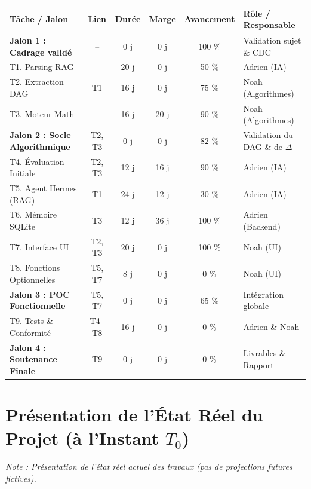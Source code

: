 \documentclass[11pt, a4paper]{article}
\begin{document}
\begin{table}[H]
\centering
\small
\begin{tabularx}{\textwidth}{l c c c c l}
\toprule
\textbf{Tâche / Jalon} & \textbf{Lien} & \textbf{Durée} & \textbf{Marge} & \textbf{Avancement} & \textbf{Rôle / Responsable} \\
\midrule
\textbf{Jalon 1 : Cadrage validé} & -- & 0 j & 0 j & 100 \% & Validation sujet \& CDC \\
T1. Parsing RAG & -- & 20 j & 0 j & 50 \% & Adrien (IA) \\
T2. Extraction DAG & T1 & 16 j & 0 j & 75 \% & Noah (Algorithmes) \\
T3. Moteur Math & -- & 16 j & 20 j & 90 \% & Noah (Algorithmes) \\
\textbf{Jalon 2 : Socle Algorithmique} & T2, T3 & 0 j & 0 j & 82 \% & Validation du DAG \& de $\Delta$ \\
T4. Évaluation Initiale & T2, T3 & 12 j & 16 j & 90 \% & Adrien (IA) \\
T5. Agent Hermes (RAG) & T1 & 24 j & 12 j & 30 \% & Adrien (IA) \\
T6. Mémoire SQLite & T3 & 12 j & 36 j & 100 \% & Adrien (Backend) \\
T7. Interface UI & T2, T3 & 20 j & 0 j & 100 \% & Noah (UI) \\
T8. Fonctions Optionnelles & T5, T7 & 8 j & 0 j & 0 \% & Noah (UI) \\
\textbf{Jalon 3 : POC Fonctionnelle} & T5, T7 & 0 j & 0 j & 65 \% & Intégration globale \\
T9. Tests \& Conformité & T4--T8 & 16 j & 0 j & 0 \% & Adrien \& Noah \\
\textbf{Jalon 4 : Soutenance Finale} & T9 & 0 j & 0 j & 0 \% & Livrables \& Rapport \\
\bottomrule
\end{tabularx}
\end{table}

\section{Présentation de l'État Réel du Projet (à l'Instant $T_0$)}

\textit{Note : Présentation de l'état réel actuel des travaux (pas de projections futures fictives).}
\end{document}
